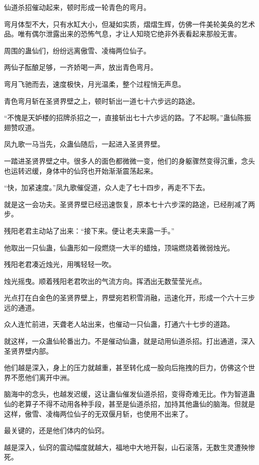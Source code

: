\begin{this_body}
仙道杀招催动起来，顿时形成一轮青色的弯月。

弯月体型不大，只有水缸大小，但凝如实质，熠熠生辉，仿佛一件美轮美奂的艺术品。唯有偶尔泄露出来的恐怖气息，才让人知晓它绝非外表看起来那般无害。

周围的蛊仙们，纷纷远离傲雪、凌梅两位仙子。

两仙子酝酿足够，一齐娇喝一声，放出青色弯月。

弯月飞驰而去，速度极快，月光温柔，整个过程悄无声息。

青色弯月斩在圣贤界壁之上，顿时斩出一道七十六步远的路途。

“不愧是天妒楼的招牌杀招之一，直接斩出七十六步远的路。了不起啊。”蛊仙陈振翅赞叹道。

凤九歌一马当先，众蛊仙随后，一起进入圣贤界壁。

一踏进圣贤界壁之中。很多人的面色都微微一变，他们的身躯骤然变得沉重，念头也运转迟缓，身体中的仙窍也开始渐渐震荡起来。

“快，加紧速度。”凤九歌催促道，众人走了七十四步，再走不下去。

就是这一会功夫。圣贤界壁已经迅速恢复，原本七十六步深的路途，已经削减了两步。

残阳老君主动站了出来：“接下来。便让老夫来露一手。”

他取出一只仙蛊，仙蛊形如一段燃烧一大半的蜡烛，顶端燃烧着微弱烛光。

残阳老君凑近烛光，用嘴轻轻一吹。

烛光摇曳。顺着残阳老君吹出的气流方向。挥洒出无数莹莹光点。

光点打在白金色的圣贤界壁上，界壁宛若积雪消融，迅速化开，形成一个六十三步远的通道。

众人连忙前进，天聋老人站出来，也催动一只仙蛊，打通六十七步的道路。

就这样，一众蛊仙轮番出力。不是催动仙蛊，就是动用仙道杀招。打出通道，深入圣贤界壁内部。

他们越是深入，身上的压力就越重，甚至转化成一股向后拖拽的巨力，仿佛这个世界不愿他们离开中洲。

脑海中的念头，也越发迟缓，这让蛊仙催发仙道杀招，变得奇难无比。作为智道蛊仙的老算子不得不动用各种手段，甚至是仙道杀招，加持其他蛊仙的脑海。但就是这样，傲雪、凌梅两位仙子的无双偃月斩，也使用不出来了。

最关键的，还是他们体内的仙窍。

越是深入，仙窍的震动幅度就越大，福地中大地开裂，山石滚落，无数生灵遭殃惨死。


\end{this_body}
